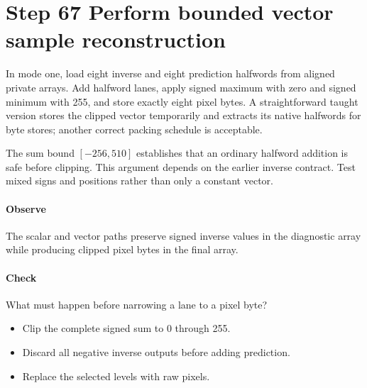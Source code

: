 \section{Step 67 Perform bounded vector sample reconstruction}\label{h263-block-s07}
In mode one, load eight inverse and eight prediction halfwords from aligned
private arrays. Add halfword lanes, apply signed maximum with zero and signed
minimum with 255, and store exactly eight pixel bytes. A straightforward taught
version stores the clipped vector temporarily and extracts its native halfwords
for byte stores; another correct packing schedule is acceptable.

The sum bound $[-256,510]$ establishes that an ordinary halfword addition is
safe before clipping. This argument depends on the earlier inverse contract.
Test mixed signs and positions rather than only a constant vector.

\paragraph{Observe} The scalar and vector paths preserve signed inverse values
in the diagnostic array while producing clipped pixel bytes in the final array.
\paragraph{Check} What must happen before narrowing a lane to a pixel byte?
\begin{itemize}
  \item[A.] Clip the complete signed sum to 0 through 255.
  \item[B.] Discard all negative inverse outputs before adding prediction.
  \item[C.] Replace the selected levels with raw pixels.
\end{itemize}

